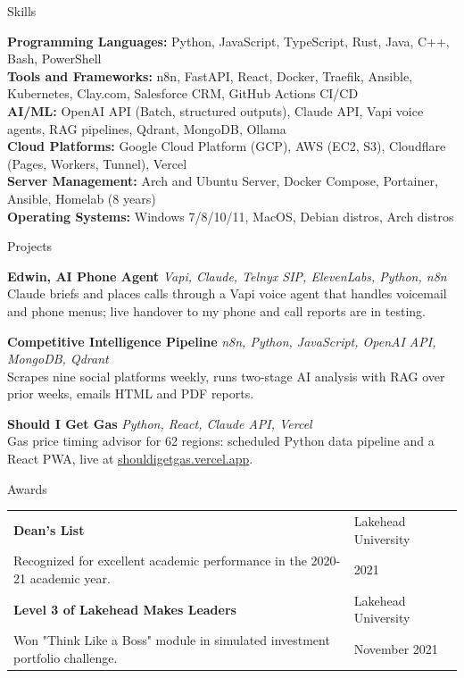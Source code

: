 \documentclass[letterpaper,10pt]{article}
\newcommand{\header} [1] {
  {\hspace*{-18pt}\vspace*{5pt} #1}
  \vspace*{-3pt} \hrulefill \\ \vspace*{5pt}
}
\begin{document}
\begin{sloppypar}
  \header{Skills}
  \textbf{Programming Languages:} Python, JavaScript, TypeScript, Rust, Java, C++, Bash, PowerShell \\
  \textbf{Tools and Frameworks:} n8n, FastAPI, React, Docker, Traefik, Ansible, Kubernetes, Clay.com, Salesforce CRM, GitHub Actions CI/CD \\
  \textbf{AI/ML:} OpenAI API (Batch, structured outputs), Claude API, Vapi voice agents, RAG pipelines, Qdrant, MongoDB, Ollama \\
  \textbf{Cloud Platforms:} Google Cloud Platform (GCP), AWS (EC2, S3), Cloudflare (Pages, Workers, Tunnel), Vercel \\
  \textbf{Server Management:} Arch and Ubuntu Server, Docker Compose, Portainer, Ansible, Homelab (8 years) \\
  \textbf{Operating Systems:} Windows 7/8/10/11, MacOS, Debian distros, Arch distros

  \header{Projects}
  \textbf{Edwin, AI Phone Agent} {\sl Vapi, Claude, Telnyx SIP, ElevenLabs, Python, n8n} \\
  Claude briefs and places calls through a Vapi voice agent that handles voicemail and phone menus; live handover to my phone and call reports are in testing.

  \textbf{Competitive Intelligence Pipeline} {\sl n8n, Python, JavaScript, OpenAI API, MongoDB, Qdrant} \\
  Scrapes nine social platforms weekly, runs two-stage AI analysis with RAG over prior weeks, emails HTML and PDF reports.

  \textbf{Should I Get Gas} {\sl Python, React, Claude API, Vercel} \\
  Gas price timing advisor for 62 regions: scheduled Python data pipeline and a React PWA, live at \href{https://shouldigetgas.vercel.app}{shouldigetgas.vercel.app}.

  \vspace{1mm}
  \header{Awards}
  \begin{tabular}{@{}p{}p{}@{}}
    \textbf{Dean's List} & Lakehead University \\
    Recognized for excellent academic performance in the 2020-21 academic year. & 2021 \\
    \textbf{Level 3 of Lakehead Makes Leaders} & Lakehead University \\
    Won "Think Like a Boss" module in simulated investment portfolio challenge. & November 2021 \\
  \end{tabular}


\end{sloppypar}
\end{document}
